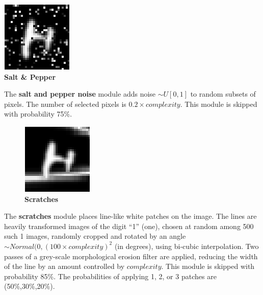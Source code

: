 \documentclass{article} %
\begin{document}
\begin{minipage}[t]{0.14\linewidth}
\centering
\includegraphics[scale=.4]{images/Poivresel_only.png}\\
{\small \bf Salt \& Pepper}
\end{minipage}%
\hspace{0.3cm}\begin{minipage}[t]{0.83\linewidth}
\vspace*{-18mm}
The {\bf salt and pepper noise} module adds noise $\sim U[0,1]$ to random subsets of pixels.
The number of selected pixels is $0.2 \times complexity$.
This module is skipped with probability 75\%.
\end{minipage}

\vspace{1mm}

\begin{minipage}[t]{\linewidth}
\begin{figure}
\begin{center}
\vspace*{-4mm}
\hspace*{-1mm}\includegraphics[scale=.4]{images/Rature_only.png}\\
{\bf Scratches}
\end{center}
\end{figure}
The {\bf scratches} module places line-like white patches on the image.  The
lines are heavily transformed images of the digit ``1'' (one), chosen
at random among 500 such 1 images,
randomly cropped and rotated by an angle $\sim Normal(0,(100 \times
complexity)^2$ (in degrees), using bi-cubic interpolation.
Two passes of a grey-scale morphological erosion filter
are applied, reducing the width of the line
by an amount controlled by $complexity$.
This module is skipped with probability 85\%. The probabilities
of applying 1, 2, or 3 patches are (50\%,30\%,20\%).
\end{minipage}
\end{document}
